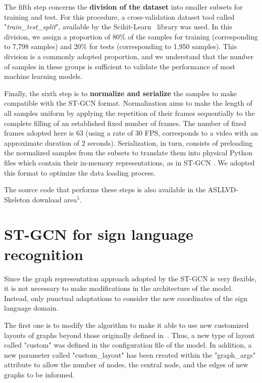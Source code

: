 
The fifth step concerns the \textbf{division of the dataset} into smaller subsets for training and test. For this procedure, a cross-validation dataset tool called "\textit{train\_test\_split}", available by the Scikit-Learn~\cite{scikit-learn} library was used. In this division, we assign a proportion of 80\% of the samples for training (corresponding to 7,798 samples) and 20\% for tests (corresponding to 1,950 samples). This division is a commonly adopted proportion, and we understand that the number of samples in these groups is sufficient to validate the performance of most machine learning models.

Finally, the sixth step is to \textbf{normalize and serialize} the samples to make compatible with the ST-GCN format. Normalization aims to make the length of all samples uniform by applying the repetition of their frames sequentially to the complete filling of an established fixed number of frames. The number of fixed frames adopted here is 63 (using a rate of 30 FPS, corresponds to a video with an approximate duration of 2 seconds). Serialization, in turn, consists of preloading the normalized samples from the subsets to translate them into physical Python files which contain their in-memory representations, as in ST-GCN \cite{st-gcn-2018}. We adopted this format to optimize the data loading process. %

The source code that performs these steps is also available in the ASLLVD-Skeleton download area$^5$. %


\section{ST-GCN for sign language recognition} 
\label{sec:st-gcn-for-sl-recognition}

Since the graph representation approach adopted by the ST-GCN is very flexible, it is not necessary to make modifications in the architecture of the model. Instead, only punctual adaptations to consider the new coordinates of the sign language domain.

The first one is to modify the algorithm to make it able to use new customized layouts of graphs beyond those originally defined in~\cite{st-gcn-2018}. Thus, a new type of layout called "custom" was defined in the configuration file of the model. In addition, a new parameter called "custom\_layout" has been created within the "graph\_args" attribute to allow the number of nodes, the central node, and the edges of new graphs to be informed.

